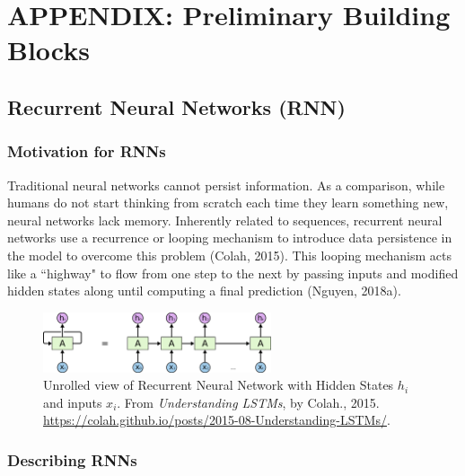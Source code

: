 \section{APPENDIX: Preliminary Building Blocks} \label{app:Appendix_BasicsRNNLSTM}

\subsection{Recurrent Neural Networks (RNN)} \label{sec:RNN}

\subsubsection{Motivation for RNNs}

Traditional neural networks cannot persist information. As a comparison, while humans do not start thinking from scratch each time they learn something new, neural networks lack memory. Inherently related to sequences, recurrent neural networks use a recurrence or looping mechanism to introduce data persistence in the model to overcome this problem (Colah, 2015). This looping mechanism acts like a ``highway" to flow from one step to the next by passing inputs and modified hidden states along until computing a final prediction (Nguyen, 2018a). 

\begin{figure}[h]
\vspace{-5pt}
\centering
\includegraphics[width=0.6\textwidth]{imgs/rnn_colah_unrolled.png}
\vspace{-5pt}
\caption{\footnotesize Unrolled view of Recurrent Neural Network with Hidden States $h_i$ and inputs $x_i$. From \emph{Understanding LSTMs}, by Colah., 2015. \url{https://colah.github.io/posts/2015-08-Understanding-LSTMs/}. }
\vspace{-5pt}
\label{fig:rnnUnrolledView}
\end{figure}


\subsubsection{Describing RNNs}

